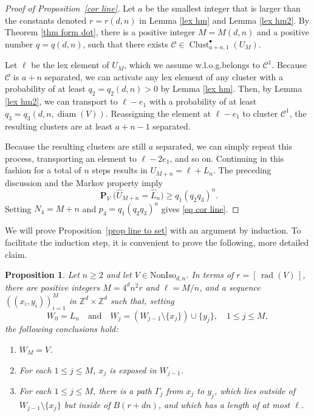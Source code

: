 \documentclass[11pt,reqno]{amsart}
\newtheorem{proposition}[lemma]{Proposition}
\theoremstyle{definition}
\numberwithin{equation}{section}
\newcommand{\Z}{\mathbb{Z}}
\newcommand{\1}{\mathbf{1}}
\DeclareMathOperator{\rad}{rad}
\DeclareMathOperator{\PP}{\mathbf{P}}
\DeclareMathOperator{\diam}{diam}
\newcommand{\noniso}{\mathrm{NonIso}}
\newcommand{\wt}{\widehat}
\newcommand{\CC}{\mathcal{C}}
\DeclareMathOperator{\Clust}{\mathrm{Clust}}
\begin{document}
\begin{proof}[Proof of Proposition~\ref{cor line}]
Let $a$ be the smallest integer that is larger than the constants denoted $r = r(d,n)$ in Lemma \ref{lex hm} and Lemma \ref{lex hm2}. By Theorem \ref{thm form dot}, there is a positive integer $M = M(d,n)$ and a positive number $q = q (d,n)$, such that there exists $\CC \in \Clust_{a+n,1}^\bullet (U_M)$.

Let $\ell$ be the lex element of $U_M$, which we assume w.l.o.g.\@ belongs to $\CC^1$. Because $\CC$ is $a+n$ separated, we can activate any lex element of any cluster with a probability of at least $q_2 = q_2 (d,n) > 0$ by Lemma \ref{lex hm}. Then, by Lemma \ref{lex hm2}, we can transport to $\ell-e_1$ with a probability of at least $q_3 = q_3 (d,n, \diam (V))$. Reassigning the element at $\ell-e_1$ to cluster $\CC^1$, the resulting clusters are at least $a + n-1$ separated.

Because the resulting clusters are still $a$ separated, we can simply repeat this process, transporting an element to $\ell-2e_1$, and so on. Continuing in this fashion for a total of $n$ steps results in $U_{M+n} = \ell + L_n$. The preceding discussion and the Markov property imply
\[ \PP_V \big( \wt U_{M+n} = \wt L_n \big) \geq q_1 (q_2 q_3)^n.\]
Setting $N_4 = M+n$ and $p_4 = q_1 (q_2 q_3)^n$ gives \eqref{eq cor line}.
\end{proof}

We will prove Proposition~\ref{prop line to set} with an argument by induction. To facilitate the induction step, it is convenient to prove the following, more detailed claim.

\begin{proposition}\label{induc arg}
Let $n \geq 2$ and let $V \in \noniso_{d,n}$. In terms of $r = [\, \rad (V)\,]$, there are positive integers $M = 4^d n^2 r$ and $\ell = M/n$, and a sequence $( (x_i,y_i) )_{i=1}^M$ in $\Z^d \times \Z^d$ 
such that, setting
\[
W_0 = L_n \quad \text{and} \quad W_j = (W_{j-1} {\setminus} \{x_j\}) \cup \{y_j\}, \quad 1 \leq j \leq M,
\]
the following conclusions hold:
\begin{enumerate}
\item[(i)] $W_M = V$.
\item[(ii)] For each $1 \leq j \leq M$, $x_j$ is exposed in $W_{j-1}$.
\item[(iii)] For each $1 \leq j \leq M$, there is a path $\Gamma_j$ from $x_j$ to $y_j$, which lies outside of $W_{j-1} {\setminus} \{x_j\}$ but inside of $B (r+dn)$, and which has a length of at most $\ell$.
\end{enumerate}
\end{proposition}
\end{document}
